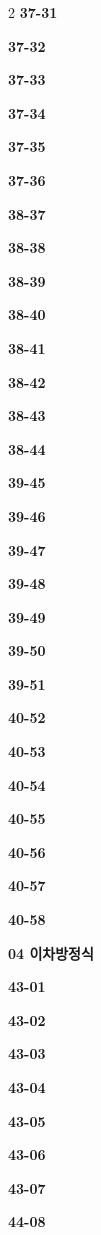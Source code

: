\documentclass[10pt,a4paper]{article}
\begin{document}
\begin{multicols}{2}
\noindent\textbf{37-31}\ \par
\noindent\textbf{37-32}\ \par
\noindent\textbf{37-33}\ \par
\noindent\textbf{37-34}\ \par
\noindent\textbf{37-35}\ \par
\noindent\textbf{37-36}\ \par
\noindent\textbf{38-37}\ \par
\noindent\textbf{38-38}\ \par
\noindent\textbf{38-39}\ \par
\noindent\textbf{38-40}\ \par
\noindent\textbf{38-41}\ \par
\noindent\textbf{38-42}\ \par
\noindent\textbf{38-43}\ \par
\noindent\textbf{38-44}\ \par
\noindent\textbf{39-45}\ \par
\noindent\textbf{39-46}\ \par
\noindent\textbf{39-47}\ \par
\noindent\textbf{39-48}\ \par
\noindent\textbf{39-49}\ \par
\noindent\textbf{39-50}\ \par
\noindent\textbf{39-51}\ \par
\noindent\textbf{40-52}\ \par
\noindent\textbf{40-53}\ \par
\noindent\textbf{40-54}\ \par
\noindent\textbf{40-55}\ \par
\noindent\textbf{40-56}\ \par
\noindent\textbf{40-57}\ \par
\noindent\textbf{40-58}\ \par
\noindent\textbf{04 이차방정식}\par\smallskip
\noindent\textbf{43-01}\ \par
\noindent\textbf{43-02}\ \par
\noindent\textbf{43-03}\ \par
\noindent\textbf{43-04}\ \par
\noindent\textbf{43-05}\ \par
\noindent\textbf{43-06}\ \par
\noindent\textbf{43-07}\ \par
\noindent\textbf{44-08}\ \par

\end{multicols}
\end{document}
